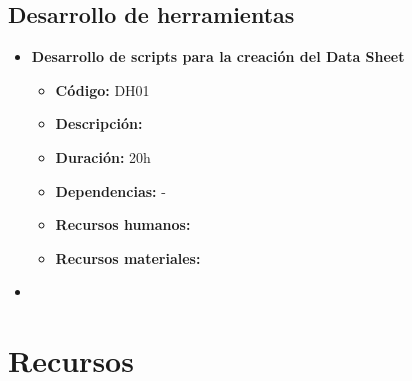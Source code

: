 \subsection{Desarrollo de herramientas}
\label{subsec:tareas_herramientas}

\begin{itemize}
    \item \textbf{Desarrollo de scripts para la creación del Data Sheet}
        \begin{itemize}
            \item \textbf{Código:} DH01
            \item \textbf{Descripción:}
            \item \textbf{Duración:} 20h
            \item \textbf{Dependencias:} -
            \item \textbf{Recursos humanos:}
            \item \textbf{Recursos materiales:}
        \end{itemize}
    \item \textbf{}
\end{itemize}

\section{Recursos}
\label{sec:recursos}
